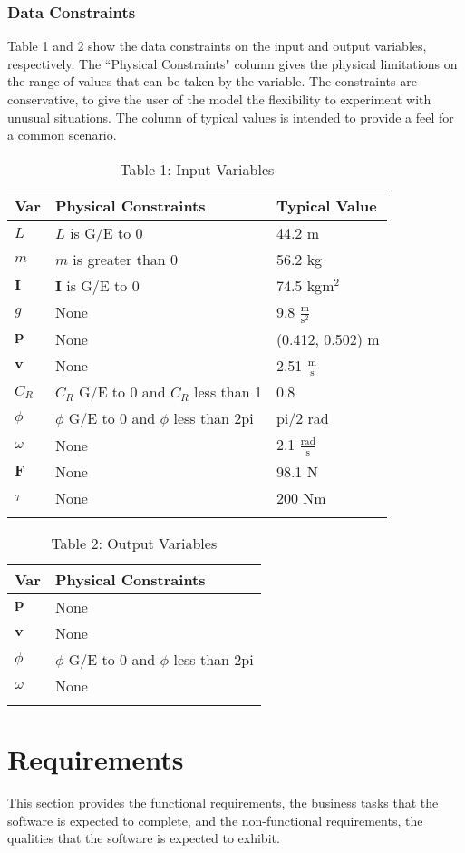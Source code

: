 \documentclass[12pt]{article}
\begin{document}
\subsubsection{Data Constraints}
\label{Sec:DC}
Table 1 and 2 show the data constraints on the input and output variables, respectively. The ``Physical Constraints" column gives the physical limitations on the range of values that can be taken by the variable. The constraints are conservative, to give the user of the model the flexibility to experiment with unusual situations. The column of typical values is intended to provide a feel for a common scenario.
\begin{longtable}{l l l}
\toprule
Var & Physical Constraints & Typical Value
\\
\midrule
$L$ & $L$ is G/E to 0 & 44.2 m
\\
$m$ & $m$ is greater than 0 & 56.2 kg
\\
$\mathbf{I}$ & $\mathbf{I}$ is G/E to 0 & 74.5 kg$\text{m}^{2}$
\\
$g$ & None & 9.8 $\frac{\text{m}}{\text{s}^{2}}$
\\
$\mathbf{p}$ & None & (0.412, 0.502) m
\\
$\mathbf{v}$ & None & 2.51 $\frac{\text{m}}{\text{s}}$
\\
$C_{R}$ & $C_{R}$ G/E to 0 and $C_{R}$ less than 1 & 0.8
\\
$\phi{}$ & $\phi{}$ G/E to 0 and $\phi{}$ less than 2pi & pi/2 rad
\\
$\omega{}$ & None & 2.1 $\frac{\text{rad}}{\text{s}}$
\\
$\mathbf{F}$ & None & 98.1 N
\\
$\tau{}$ & None & 200 Nm
\\
\bottomrule
\caption{Table 1: Input Variables}
\label{Table:T1IV}
\end{longtable}
\begin{longtable}{l l}
\toprule
Var & Physical Constraints
\\
\midrule
$\mathbf{p}$ & None
\\
$\mathbf{v}$ & None
\\
$\phi{}$ & $\phi{}$ G/E to 0 and $\phi{}$ less than 2pi
\\
$\omega{}$ & None
\\
\bottomrule
\caption{Table 2: Output Variables}
\label{Table:T2OV}
\end{longtable}
\section{Requirements}
\label{Sec:R}
This section provides the functional requirements, the business tasks that the software is expected to complete, and the non-functional requirements, the qualities that the software is expected to exhibit.
\end{document}
